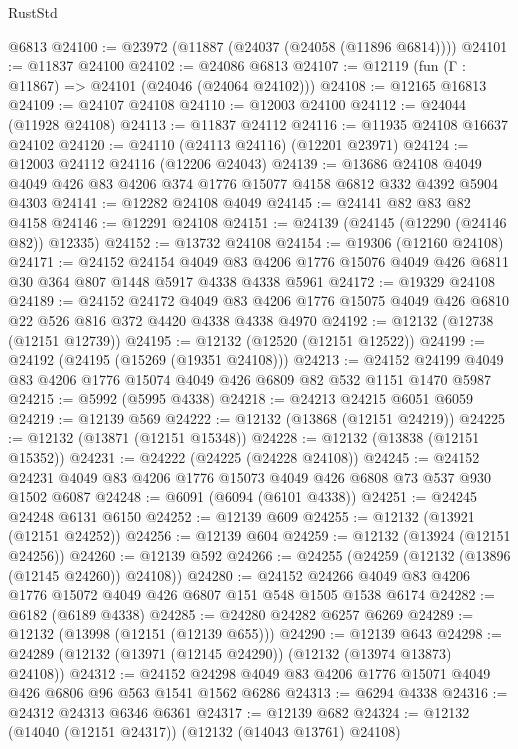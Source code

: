 \begin{lexlean}{RustStd}
\begin{coremodule}
    @6813
@24100 := @23972 (@11887 (@24037 (@24058 (@11896 @6814))))
@24101 := @11837 @24100
@24102 := @24086 @6813
@24107 := @12119 (fun (Γ : @11867) => @24101 (@24046 (@24064 @24102)))
@24108 := @12165 @16813
@24109 := @24107 @24108
@24110 := @12003 @24100
@24112 := @24044 (@11928 @24108)
@24113 := @11837 @24112
@24116 := @11935 @24108 @16637 @24102
@24120 := @24110 (@24113 @24116) (@12201 @23971)
@24124 := @12003 @24112 @24116 (@12206 @24043)
@24139 := @13686
    @24108
    @4049
    @4049
    @426
    @83
    @4206
    @374
    @1776
    @15077
    @4158
    @6812
    @332
    @4392
    @5904
    @4303
@24141 := @12282 @24108 @4049
@24145 := @24141 @82 @83 @82 @4158
@24146 := @12291 @24108
@24151 := @24139 (@24145 (@12290 (@24146 @82)) @12335)
@24152 := @13732 @24108
@24154 := @19306 (@12160 @24108)
@24171 := @24152
    @24154
    @4049
    @83
    @4206
    @1776
    @15076
    @4049
    @426
    @6811
    @30
    @364
    @807
    @1448
    @5917
    @4338
    @4338
    @5961
@24172 := @19329 @24108
@24189 := @24152
    @24172
    @4049
    @83
    @4206
    @1776
    @15075
    @4049
    @426
    @6810
    @22
    @526
    @816
    @372
    @4420
    @4338
    @4338
    @4970
@24192 := @12132 (@12738 (@12151 @12739))
@24195 := @12132 (@12520 (@12151 @12522))
@24199 := @24192 (@24195 (@15269 (@19351 @24108)))
@24213 := @24152 @24199 @4049 @83 @4206 @1776 @15074 @4049 @426 @6809 @82 @532 @1151 @1470 @5987
@24215 := @5992 (@5995 @4338)
@24218 := @24213 @24215 @6051 @6059
@24219 := @12139 @569
@24222 := @12132 (@13868 (@12151 @24219))
@24225 := @12132 (@13871 (@12151 @15348))
@24228 := @12132 (@13838 (@12151 @15352))
@24231 := @24222 (@24225 (@24228 @24108))
@24245 := @24152 @24231 @4049 @83 @4206 @1776 @15073 @4049 @426 @6808 @73 @537 @930 @1502 @6087
@24248 := @6091 (@6094 (@6101 @4338))
@24251 := @24245 @24248 @6131 @6150
@24252 := @12139 @609
@24255 := @12132 (@13921 (@12151 @24252))
@24256 := @12139 @604
@24259 := @12132 (@13924 (@12151 @24256))
@24260 := @12139 @592
@24266 := @24255 (@24259 (@12132 (@13896 (@12145 @24260)) @24108))
@24280 := @24152 @24266 @4049 @83 @4206 @1776 @15072 @4049 @426 @6807 @151 @548 @1505 @1538 @6174
@24282 := @6182 (@6189 @4338)
@24285 := @24280 @24282 @6257 @6269
@24289 := @12132 (@13998 (@12151 (@12139 @655)))
@24290 := @12139 @643
@24298 := @24289 (@12132 (@13971 (@12145 @24290)) (@12132 (@13974 @13873) @24108))
@24312 := @24152 @24298 @4049 @83 @4206 @1776 @15071 @4049 @426 @6806 @96 @563 @1541 @1562 @6286
@24313 := @6294 @4338
@24316 := @24312 @24313 @6346 @6361
@24317 := @12139 @682
@24324 := @12132 (@14040 (@12151 @24317)) (@12132 (@14043 @13761) @24108)

\end{coremodule}
\end{lexlean}
